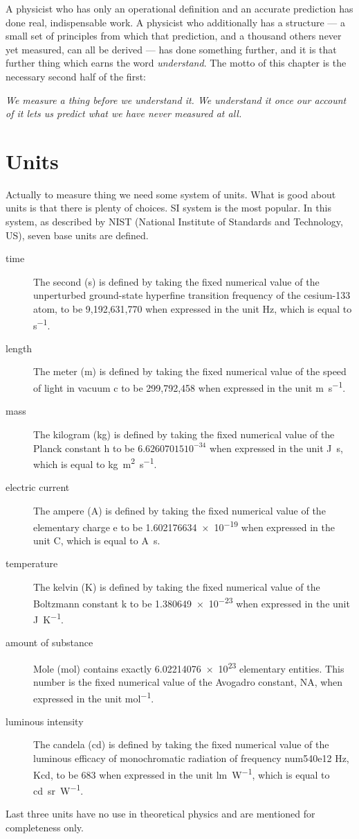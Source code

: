 A physicist who has only an operational definition and an accurate prediction
has done real, indispensable work. A
physicist who additionally has a structure --- a small set of principles from
which that prediction, and a thousand others never yet measured, can all be
derived --- has done something further, and it is that further thing which
earns the word \emph{understand}. The motto of this chapter is the necessary
second half of the first:

\emph{We measure a thing before we understand it. We understand it once our
account of it lets us predict what we have never measured at all.}

\section{Units}
\label{rm:un}

Actually to measure thing we need some
system of units. What is good about units is that there is plenty of choices.
SI system is the most popular. In this system, as described by NIST (National
Institute of Standards and Technology, US), seven base units are defined.
\begin{description}
    \item [time] 
        The second (s) is defined by taking the fixed numerical value of the
        unperturbed ground-state hyperfine transition frequency of the
        cesium-133 atom, to be 9,192,631,770 when expressed in the unit Hz,
        which is equal to \unit{ s^{-1}}.
    \item [length] 
        The meter (m) is defined by taking the fixed numerical value of the
        speed of light in vacuum c to be 299,792,458 when expressed in the unit
        \unit{m.s^{-1}}.
    \item [mass] 
    The kilogram (kg) is defined by taking the fixed numerical value of the
        Planck constant h to be $6.62607015 10^{-34}$ when expressed in the
        unit \unit{J.s}, which is equal to \unit{kg.m^2.s^{-1}}.
    \item [electric current] 
    The ampere (A) is defined by taking the fixed numerical value of the
        elementary charge e to be \num{1.602176634e-19} when expressed in the
        unit C, which is equal to \unit{A.s}.
    \item [temperature] 
    The kelvin (K) is defined by taking the fixed numerical value of the
        Boltzmann constant k to be \num{1.380 649e-23} when expressed in the
        unit \unit{J.K^{-1}}.
    \item [amount of substance] 
    Mole (mol) contains exactly \num{6.02214076e23} elementary entities. This
        number is the fixed numerical value of the Avogadro constant, NA, when
        expressed in the unit \unit{mol^{-1}}.
    \item [luminous intensity] 
    The candela (cd) is defined by taking the fixed numerical value of the
        luminous efficacy of monochromatic radiation of frequency num{540e12}
        Hz, Kcd, to be 683 when expressed in the unit \unit{lm.W^{-1}}, which
        is equal to \unit{cd.sr.W^{-1}}.
\end{description}
Last three units have no use in theoretical physics and are mentioned for 
completeness only.

